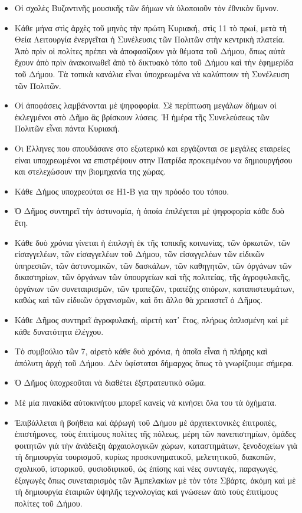 \documentclass[a4paper]{article}
\begin{document}
\begin{itemize}
\item Οἱ σχολὲς Βυζαντινῆς μουσικῆς τῶν δήμων νὰ ὑλοποιοῦν τὸν ἐθνικὸν ὕμνον.
\item Κάθε μήνα στὶς ἀρχὲς τοῦ μηνὸς τὴν πρώτη Κυριακή, στὶς 11 τὸ πρωί, μετὰ τὴ Θεία Λειτουργία ἐνεργεῖται ἡ Συνέλευσις τῶν Πολιτῶν στὴν κεντρικὴ πλατεία. Ἀπὸ πρὶν οἱ πολίτες πρέπει νὰ ἀποφασίζουν γιὰ θέματα τοῦ Δήμου, ὅπως αὐτὰ ἔχουν ἀπὸ πρὶν ἀνακοινωθεῖ ἀπὸ τὸ δικτυακὸ τόπο τοῦ Δήμου καὶ τὴν ἐφημερίδα τοῦ Δήμου. Τὰ τοπικὰ κανάλια εἶναι ὑποχρεωμένα νὰ καλύπτουν τὴ Συνέλευση τῶν Πολιτῶν.
\item Οἱ ἀποφάσεις λαμβάνονται μὲ ψηφοφορία. Σὲ περίπτωση μεγάλων δήμων οἱ ἐκλεγμένοι στὸ Δῆμο ἂς βρίσκουν λύσεις. Ἡ ἡμέρα τῆς Συνελεύσεως τῶν Πολιτῶν εἶναι πάντα Κυριακή.
\item Οι Έλληνες που σπουδάσανε στο εξωτερικό και εργάζονται σε μεγάλες εταιρείες είναι υποχρεωμένοι να επιστρέψουν στην Πατρίδα προκειμένου να δημιουργήσου και στελεχώσουν την βιομηχανία της χώρας.
\item Κάθε Δήμος υποχρεούται σε Η1-Β για την πρόοδο του τόπου.
\item Ὁ Δῆμος συντηρεῖ τὴν ἀστυνομία, ἡ ὁποία ἐπιλέγεται μὲ ψηφοφορία κάθε δυὸ ἔτη.
\item Κάθε δυὸ χρόνια γίνεται ἡ ἐπιλογὴ ἐκ τῆς τοπικῆς κοινωνίας, τῶν ὁρκωτῶν, τῶν εἰσαγγελέων, τῶν εἰσαγγελέων τοῦ Δήμου, τῶν εἰσαγγελέων τῶν εἰδικῶν ὑπηρεσιῶν, τῶν ἀστυνομικῶν, τῶν δασκάλων, τῶν καθηγητῶν, τῶν ὀργάνων τῶν δικαστηρίων, τῶν ὀργάνων τῶν ὑπουργείων καὶ τῆς πολιτείας, τῆς ἀγροφυλακῆς, ὀργάνων τῶν συνεταιρισμῶν, τῶν τραπεζῶν, τραπέζης σπόρων, καταπιστευμάτων, καθὼς καὶ τῶν εἰδικῶν ὀργανισμῶν, καὶ ὅτι ἄλλο θὰ χρειαστεῖ ὁ Δῆμος.
\item Κάθε Δῆμος συντηρεῖ ἀγροφυλακή, αἱρετὴ κατ᾿ ἔτος, πλήρως ὁπλισμένη καὶ μὲ κάθε δυνατότητα ἐλέγχου.
\item Τὸ συμβούλιο τῶν 7, αἱρετὸ κάθε δυὸ χρόνια, ἡ ὁποῖα εἶναι ἡ πλήρης καὶ ἀπόλυτη ἀρχὴ τοῦ Δήμου. Δὲν ὑφίσταται δήμαρχος ὅπως τὸ γνωρίζουμε σήμερα.
\item Ὁ Δῆμος ὑποχρεοῦται νὰ διαθέτει ἐξστρατευτικὸ σῶμα.
\item Μὲ μία πινακίδα αὐτοκινήτου μπορεῖ κανεὶς νὰ κινήσει ὅλα του τὰ ὀχήματα.
\item Ἐπιβάλλεται ἡ βοήθεια καὶ ἀῤῥωγὴ τοῦ Δήμου μὲ ἀρχιτεκτονικὲς ἐπιτροπές, ἐπιστήμονες, τοὺς ἐπιτίμους πολίτες τῆς πόλεως, μέρη τῶν πανεπιστημίων, ὁμάδες φοιτητῶν γιὰ τὴν ἀνάδειξη ἀρχαιολογικῶν χώρων, καταστημάτων, ξενοδοχείων γιὰ τὴ δημιουργία τουρισμοῦ, κυρίως προσκυνηματικοῦ, μελετητικοῦ, διακοπῶν, σχολικοῦ, ἱστορικοῦ, φυσιοδιφικοῦ, ὡς ἐπίσης καὶ νέες συνταγές, παραγωγές, ἐξαγωγὲς ὅπως συνεταιρισμὸς τῶν Ἀμπελακίων μὲ τὸν τότε Σβάρτς, ἀκόμη καὶ μὲ τὴ δημιουργία ἐταιριῶν ὑψηλῆς τεχνολογίας καὶ γνώσεων ἀπὸ τοὺς ἐπιτίμους πολίτες τοῦ Δήμου.

\end{itemize}
\end{document}
